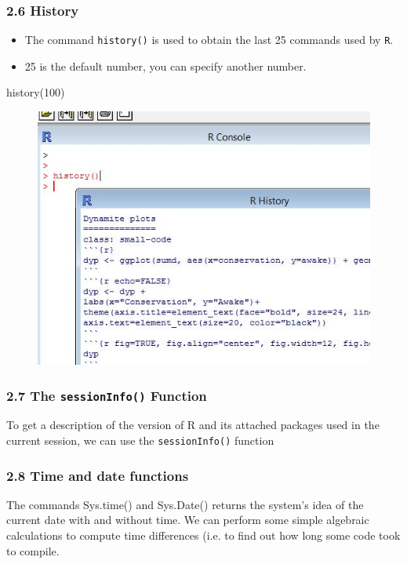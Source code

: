  \frametitle{2.6 History}
 \begin{itemize}
 \item The command \texttt{history()} is used to obtain the last 25 commands used by \texttt{R}.
 \item 25 is the default number, you can specify another number.
 \end{itemize}
 \begin{framed}
 \begin{semiverbatim}
 history(100)
 \end{semiverbatim}
 \end{framed}
 
 
 
 \begin{figure}
 \centering
 \includegraphics[width=0.7\linewidth]{images/Rhistory}        
 \end{figure}
    
 
 \frametitle{2.7 The \texttt{sessionInfo()} Function}
 To get a description of the version of R and its attached packages used in the current session,
 we can use the \texttt{sessionInfo()} function
 
 
 
 \frametitle{2.8 Time and date functions}
 The commands Sys.time() and Sys.Date() returns the system’s idea of the current date
 with and without time. We can perform some simple algebraic calculations to compute time
 differences (i.e. to find out how long some code took to compile.
 
